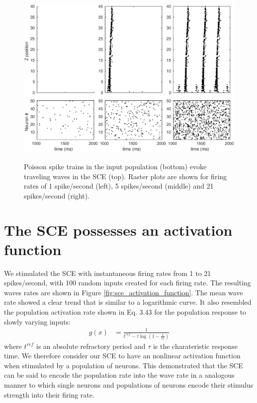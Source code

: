 \begin{figure}[!htb]
 \centering
 \caption{Poisson spike trains in the input population (bottom) evoke traveling waves in the SCE (top). 
	  Raster plots are shown for firing rates of 1 spike/second (left), 5 spikes/second (middle) and 21 spikes/second (right).  }
 \includegraphics[width=\textwidth]{fig/SCE_2x2_FRE_rasters}
 \label{fig:sce_raster}
\end{figure}

\FloatBarrier

\section{The SCE possesses an activation function}
We stimulated the SCE with instantaneous firing rates from 1 to 21 spikes/second, with 100 random inputs created for each firing rate.
The resulting waves rates are shown in Figure \ref{fig:sce_activation_function}.
The mean wave rate showed a clear trend that is similar to a logarithmic curve. 
It also resembled the population activation rate shown in \citet{Trappenberg2010} Eq. 3.43 for the population response to slowly varying inputs:
\begin{align}
 g(x) &= \frac{1}{t^{ref}-\tau \log{(1-\frac{1}{\tau x})}}
\end{align}
where $t^{ref}$ is an absolute refractory period and $\tau$ is the charateristic response time.
We therefore consider our SCE to have an nonlinear activation function when stimulated by a  population of neurons.
This demonstrated that the SCE can be said to encode the population rate into the wave rate in a analogous manner to which single neurons and populations of neurons encode their stimulus strength into their firing rate.

